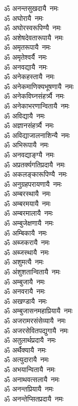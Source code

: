 \begin{flushleft}
\begin{multicols}{2}
ॐ अनन्तसुखदायै~नमः\\
ॐ अघोरायै~नमः\\
ॐ अघोरस्वरूपिण्यै~नमः\\
ॐ अशेषदेवतारूपायै~नमः\\
ॐ अमृतरूपायै~नमः\\
ॐ अमृतेश्वर्यै~नमः\\
ॐ अनवद्यायै~नमः\\
ॐ अनेकहस्तायै~नमः\hfill{}\\
ॐ अनेकमाणिक्यभूषणायै~नमः\\
ॐ अनेकविघ्नसंहर्त्र्यै~नमः\\
ॐ अनेकाभरणान्वितायै~नमः\\
ॐ अविद्यायै~नमः\\
ॐ अज्ञानसंहर्त्र्यै~नमः\\
ॐ अविद्याजालनाशिन्यै~नमः\\
ॐ अभिरूपायै~नमः\\
ॐ अनवद्याङ्ग्यै~नमः\\
ॐ अप्रतर्क्यगतिप्रदायै~नमः\\
ॐ अकलङ्कारूपिण्यै~नमः\hfill{}\\
ॐ अनुग्रहपरायणायै~नमः\\
ॐ अम्बरस्थायै~नमः\\
ॐ अम्बरमयायै~नमः\\
ॐ अम्बरमालायै~नमः\\
ॐ अम्बुजेक्षणायै~नमः\\
ॐ अम्बिकायै~नमः\\
ॐ अब्जकरायै~नमः\\
ॐ अब्जस्थायै~नमः\\
ॐ अशुमत्यै~नमः\\
ॐ अंशुशतान्वितायै~नमः\hfill{}\\
ॐ अम्बुजायै~नमः\\
ॐ अनवरायै~नमः\\
ॐ अखण्डायै~नमः\\
ॐ अम्बुजासनमहाप्रियायै~नमः\\
ॐ अजरामरसंसेव्यायै~नमः\\
ॐ अजरसेवितपद्युगायै~नमः\\
ॐ अतुलार्थप्रदायै~नमः\\
ॐ अर्थैक्यायै~नमः\\
ॐ अत्युदारायै~नमः\\
ॐ अभयान्वितायै~नमः\hfill{}\\
ॐ अनाथवत्सलायै~नमः\\
ॐ अनन्तप्रियायै~नमः\\
ॐ अनन्तेप्सितप्रदायै~नमः\\

\end{multicols}
\end{flushleft}
